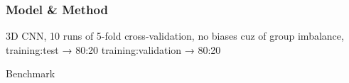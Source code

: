 \subsubsection{Model \& Method}

3D CNN,
10 runs of 5-fold cross-validation,
no biases cuz of group imbalance,
training:test → 80:20
training:validation → 80:20

\begin{table}[htbp]
	\centering
	\caption{Benchmark}

	\caption{Results}
\end{table}
